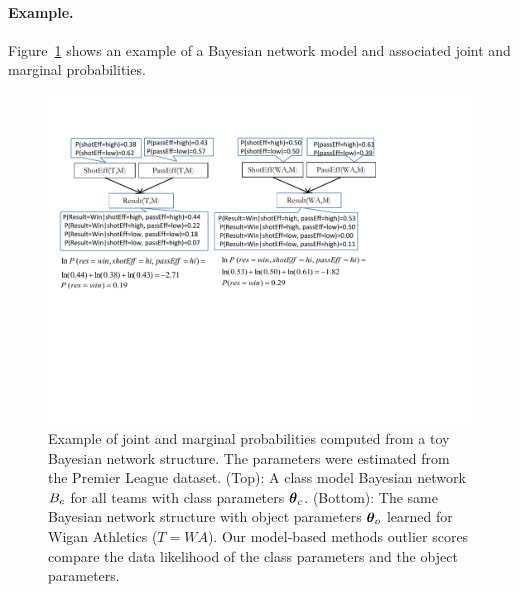  	\paragraph{Example.} Figure~\ref{fig:bns-chap3} shows an example of a Bayesian network model and associated joint and marginal probabilities.
 	\begin{figure}[t]
 		\centering
 		\includegraphics[width=1\textwidth] 
 		{figures/bnuncropped}
 		\caption{Example of joint and marginal probabilities computed from a toy Bayesian network structure. The parameters were estimated from the  Premier League dataset. (Top): A class model Bayesian network $B_{c}$ for all teams with class parameters $\boldsymbol{\theta}_{c}$. (Bottom): The same Bayesian network structure with object parameters $\boldsymbol{\theta}_{o}$ learned for Wigan Athletics ($T = WA$). Our model-based methods outlier scores compare the data likelihood of the class parameters and the object parameters.
 			\label{fig:bns-chap3}
 		}
 	\end{figure}
 	
 
 	
 	
